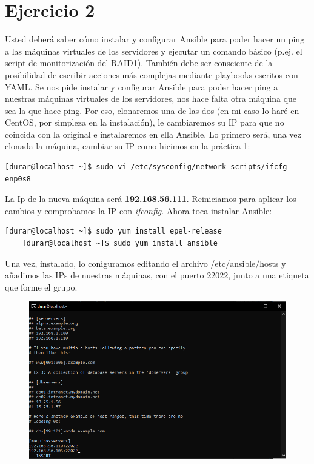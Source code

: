 \documentclass[a4paper]{article}
\begin{document}
\section{Ejercicio 2}
Usted deberá saber cómo instalar y configurar Ansible para poder hacer
un ping a las máquinas virtuales de los servidores y ejecutar un comando básico (p.ej. el
script de monitorización del RAID1). También debe ser consciente de la posibilidad de
escribir acciones más complejas mediante playbooks escritos con YAML.
\newline
Se nos pide instalar y configurar Ansible para poder hacer ping a nuestras máquinas virtuales de 
los servidores, nos hace falta otra máquina que sea la que hace ping. Por eso, clonaremos una de las dos
(en mi caso lo haré en CentOS, por simpleza en la instalación), le cambiaremos su IP para que no 
coincida con la original e instalaremos en ella Ansible. 
Lo primero será, una vez clonada la máquina, cambiar su IP como hicimos en la práctica 1:
\begin{lstlisting}[style=bashCentOS]
    [durar@localhost ~]$ sudo vi /etc/sysconfig/network-scripts/ifcfg-enp0s8
\end{lstlisting}
La Ip de la nueva máquina será \textbf{192.168.56.111}. Reiniciamos para aplicar los cambios y
comprobamos la IP con \textsl{ifconfig}.
Ahora toca instalar Ansible:
\begin{lstlisting}[style=bashCentOS]
    [durar@localhost ~]$ sudo yum install epel-release
    [durar@localhost ~]$ sudo yum install ansible
\end{lstlisting}
Una vez, instalado, lo coniguramos editando el archivo /etc/ansible/hosts y añadimos las IPs de nuestras
máquinas, con el puerto 22022, junto a una etiqueta que forme el grupo.
\newpage
\begin{figure}
    \centering
    \includegraphics[width=\textwidth]{cambiando conf de ansible1.png}
\end{figure}
\end{document}
